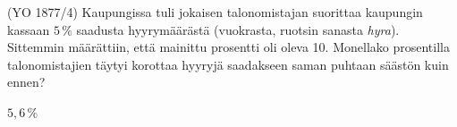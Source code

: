 \begin{tehtavasivu}
\begin{tehtava}
    (YO 1877/4) Kaupungissa tuli jokaisen talonomistajan suorittaa kaupungin kassaan $5\,\%$ saadusta hyyrymäärästä (vuokrasta, ruotsin sanasta \textit{hyra}). Sittemmin määrättiin, että mainittu prosentti oli oleva 10. Monellako prosentilla talonomistajien täytyi korottaa hyyryjä saadakseen saman puhtaan säästön kuin ennen?
    \begin{vastaus}
        $5,6\,\%$
    \end{vastaus}
\end{tehtava}


\end{tehtavasivu}
